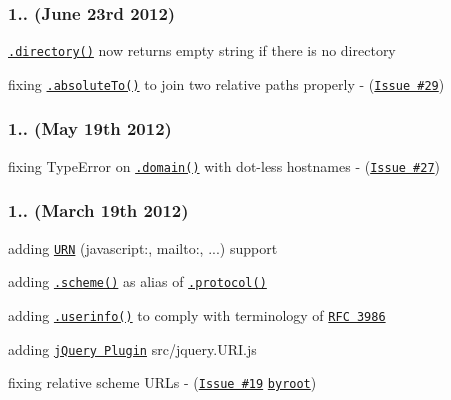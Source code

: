\subsubsection*{1.. (June 23rd 2012)}


\begin{DoxyItemize}
\item \href{http://medialize.github.io/URI.js/docs.html#accessors-directory}{\tt {\ttfamily .directory()}} now returns empty string if there is no directory
\item fixing \href{http://medialize.github.io/URI.js/docs.html#absoluteto}{\tt {\ttfamily .absolute\+To()}} to join two relative paths properly -\/ (\href{https://github.com/medialize/URI.js/issues/29}{\tt Issue \#29})
\end{DoxyItemize}

\subsubsection*{1.. (May 19th 2012)}


\begin{DoxyItemize}
\item fixing Type\+Error on \href{http://medialize.github.io/URI.js/docs.html#accessors-domain}{\tt {\ttfamily .domain()}} with dot-\/less hostnames -\/ (\href{https://github.com/medialize/URI.js/issues/27}{\tt Issue \#27})
\end{DoxyItemize}

\subsubsection*{1.. (March 19th 2012)}


\begin{DoxyItemize}
\item adding \href{http://tools.ietf.org/html/rfc3986#section-3}{\tt U\+RN} ({\ttfamily javascript\+:}, {\ttfamily mailto\+:}, ...) support
\item adding \href{http://medialize.github.io/URI.js/docs.html#accessors-protocol}{\tt {\ttfamily .scheme()}} as alias of \href{http://medialize.github.io/URI.js/docs.html#accessors-protocol}{\tt {\ttfamily .protocol()}}
\item adding \href{http://medialize.github.io/URI.js/docs.html#accessors-userinfo}{\tt {\ttfamily .userinfo()}} to comply with terminology of \href{http://tools.ietf.org/html/rfc3986#section-3.2.1}{\tt R\+FC 3986}
\item adding \href{http://medialize.github.io/URI.js/jquery-uri-plugin.html}{\tt j\+Query Plugin} {\ttfamily src/jquery.\+U\+R\+I.\+js}
\item fixing relative scheme U\+R\+Ls -\/ (\href{https://github.com/medialize/URI.js/issues/19}{\tt Issue \#19} \href{https://github.com/byroot}{\tt byroot})
\end{DoxyItemize}

